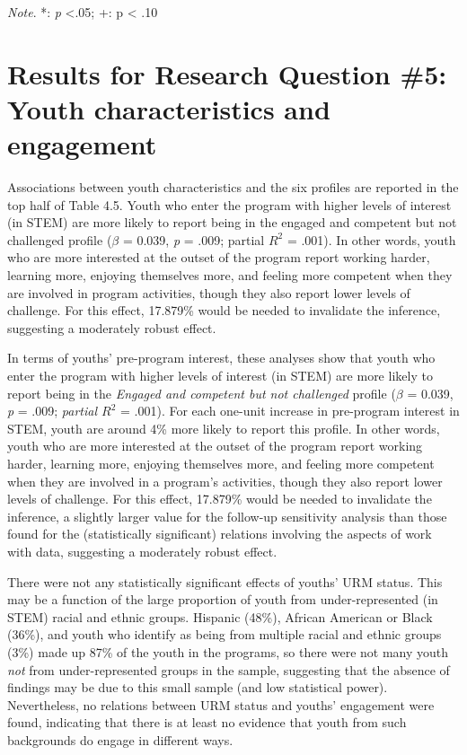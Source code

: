 \documentclass[]{book}
\theoremstyle{definition}
\theoremstyle{definition}
\theoremstyle{definition}
\theoremstyle{remark}
\begin{document}
\emph{Note}. *: \emph{p} \textless{}.05; +: p \textless{} .10

\section{Results for Research Question \#5: Youth characteristics and
engagement}\label{results-for-research-question-5-youth-characteristics-and-engagement}

Associations between youth characteristics and the six profiles are
reported in the top half of Table 4.5. Youth who enter the program with
higher levels of interest (in STEM) are more likely to report being in
the engaged and competent but not challenged profile (\(\beta\) = 0.039,
\emph{p} = .009; partial \(R^2\) = .001). In other words, youth who are
more interested at the outset of the program report working harder,
learning more, enjoying themselves more, and feeling more competent when
they are involved in program activities, though they also report lower
levels of challenge. For this effect, 17.879\% would be needed to
invalidate the inference, suggesting a moderately robust effect.

In terms of youths' pre-program interest, these analyses show that youth
who enter the program with higher levels of interest (in STEM) are more
likely to report being in the \emph{Engaged and competent but not
challenged} profile (\(\beta\) = 0.039, \emph{p} = .009; \emph{partial
\(R^2\)} = .001). For each one-unit increase in pre-program interest in
STEM, youth are around 4\% more likely to report this profile. In other
words, youth who are more interested at the outset of the program report
working harder, learning more, enjoying themselves more, and feeling
more competent when they are involved in a program's activities, though
they also report lower levels of challenge. For this effect, 17.879\%
would be needed to invalidate the inference, a slightly larger value for
the follow-up sensitivity analysis than those found for the
(statistically significant) relations involving the aspects of work with
data, suggesting a moderately robust effect.

There were not any statistically significant effects of youths' URM
status. This may be a function of the large proportion of youth from
under-represented (in STEM) racial and ethnic groups. Hispanic (48\%),
African American or Black (36\%), and youth who identify as being from
multiple racial and ethnic groups (3\%) made up 87\% of the youth in the
programs, so there were not many youth \emph{not} from under-represented
groups in the sample, suggesting that the absence of findings may be due
to this small sample (and low statistical power). Nevertheless, no
relations between URM status and youths' engagement were found,
indicating that there is at least no evidence that youth from such
backgrounds do engage in different ways.
\end{document}
